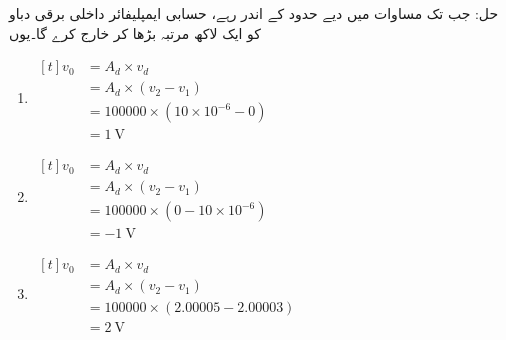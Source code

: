 حل:	جب تک  مساوات   میں دیے حدود کے اندر رہے، حسابی ایمپلیفائر داخلی برقی دباو کو ایک لاکھ مرتبہ بڑھا کر خارج کرے گا۔یوں
\begin{enumerate}
\item $\begin{aligned}[t]
v_0 &=A_d \times v_d \\
&=A_d \times \left (v_2 - v_1 \right )\\
&=100000 \times \left(10\times 10^{-6}-0 \right )\\
&=\SI{1}{\volt}
\end{aligned}$
%
\item $\begin{aligned}[t]
v_0 &=A_d \times v_d \\
&=A_d \times \left (v_2 - v_1 \right )\\
&=100000 \times \left(0-10\times 10^{-6} \right )\\
&=\SI{-1}{\volt}
\end{aligned}$
%
\item $\begin{aligned}[t]
v_0 &=A_d \times v_d \\
&=A_d \times \left (v_2 - v_1 \right )\\
&=100000 \times \left(2.00005-2.00003 \right )\\
&=\SI{2}{\volt}
\end{aligned}$


\end{enumerate}
